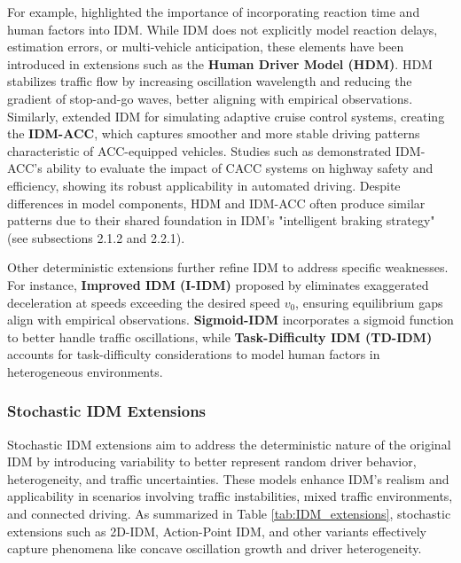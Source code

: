 \documentclass[a4paper,fleqn]{cas-sc}
\begin{document}
For example, \cite{treiber_delays_2006} highlighted the importance of incorporating reaction time and human factors into IDM. While IDM does not explicitly model reaction delays, estimation errors, or multi-vehicle anticipation, these elements have been introduced in extensions such as the \textbf{Human Driver Model (HDM)}. HDM stabilizes traffic flow by increasing oscillation wavelength and reducing the gradient of stop-and-go waves, better aligning with empirical observations. Similarly, \cite{kestingAdaptiveCruiseControlDesign2008} extended IDM for simulating adaptive cruise control systems, creating the \textbf{IDM-ACC}, which captures smoother and more stable driving patterns characteristic of ACC-equipped vehicles. Studies such as \cite{li_evaluation_2017,li_evaluating_2017} demonstrated IDM-ACC's ability to evaluate the impact of CACC systems on highway safety and efficiency, showing its robust applicability in automated driving. Despite differences in model components, HDM and IDM-ACC often produce similar patterns due to their shared foundation in IDM's "intelligent braking strategy" (see subsections 2.1.2 and 2.2.1).

Other deterministic extensions further refine IDM to address specific weaknesses. For instance, \textbf{Improved IDM (I-IDM)} proposed by \cite{treiberTrafficFlowDynamics2013} eliminates exaggerated deceleration at speeds exceeding the desired speed $v_0$, ensuring equilibrium gaps align with empirical observations. \textbf{Sigmoid-IDM} \citep{chen_sigmoid-based_2024} incorporates a sigmoid function to better handle traffic oscillations, while \textbf{Task-Difficulty IDM (TD-IDM)} \citep{saifuzzamanIncorporatingHumanFactorsCarFollowingModels2014} accounts for task-difficulty considerations to model human factors in heterogeneous environments.

\subsubsection{Stochastic IDM Extensions}

Stochastic IDM extensions aim to address the deterministic nature of the original IDM by introducing variability to better represent random driver behavior, heterogeneity, and traffic uncertainties. These models enhance IDM's realism and applicability in scenarios involving traffic instabilities, mixed traffic environments, and connected driving. As summarized in Table \ref{tab:IDM_extensions}, stochastic extensions such as 2D-IDM, Action-Point IDM, and other variants effectively capture phenomena like concave oscillation growth and driver heterogeneity.
\end{document}
